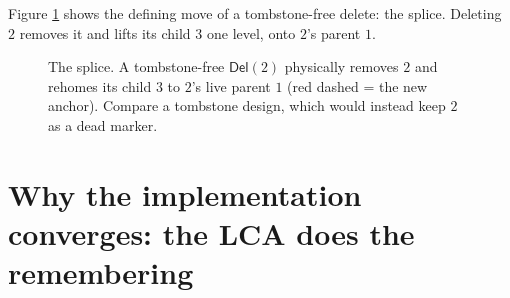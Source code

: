 \documentclass[11pt]{article}
\newcommand{\Del}{\mathsf{Del}}
\begin{document}
Figure \ref{fig:splice} shows the defining move of a tombstone-free delete: the
splice. Deleting $2$ removes it and lifts its child $3$ one level, onto $2$'s
parent $1$.

\begin{figure}[h]
\centering
{}
\caption{The splice. A tombstone-free $\Del(2)$ physically removes $2$ and rehomes
its child $3$ to $2$'s live parent $1$ (red dashed = the new anchor). Compare a
tombstone design, which would instead keep $2$ as a dead marker.}
\label{fig:splice}
\end{figure}

\section{Why the implementation converges: the LCA does the remembering}
\label{sec:merge}
\end{document}
